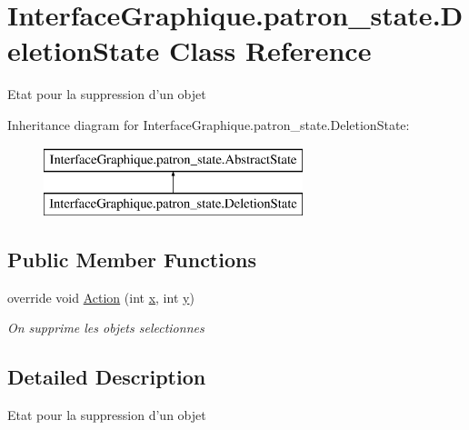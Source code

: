 \hypertarget{class_interface_graphique_1_1patron__state_1_1_deletion_state}{\section{Interface\-Graphique.\-patron\-\_\-state.\-Deletion\-State Class Reference}
\label{class_interface_graphique_1_1patron__state_1_1_deletion_state}
}


Etat pour la suppression d'un objet  


Inheritance diagram for Interface\-Graphique.\-patron\-\_\-state.\-Deletion\-State\-:\begin{figure}[H]
\begin{center}
\leavevmode
\includegraphics[height=2.000000cm]{class_interface_graphique_1_1patron__state_1_1_deletion_state}
\end{center}
\end{figure}
\subsection*{Public Member Functions}
\begin{DoxyCompactItemize}
\item 
override void \hyperlink{class_interface_graphique_1_1patron__state_1_1_deletion_state_ab720f529b212ff1b98d5e97f7fcb199f}{Action} (int \hyperlink{group__inf2990_ga6150e0515f7202e2fb518f7206ed97dc}{x}, int \hyperlink{group__inf2990_ga0a2f84ed7838f07779ae24c5a9086d33}{y})
\begin{DoxyCompactList}\small\item\em On supprime les objets selectionnes \end{DoxyCompactList}\end{DoxyCompactItemize}


\subsection{Detailed Description}
Etat pour la suppression d'un objet 



